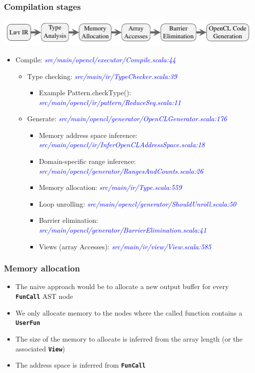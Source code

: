 \documentclass[10pt]{beamer}
\newcommand{\srcurl}[1]{\textcolor{blue}{\textit{#1}}}
\newcommand{\code}[1]{\textbf{\texttt{#1}}}
\begin{document}
\begin{frame}
\frametitle{Compilation stages}
    \begin{block}{}
        \begin{center}
            \includegraphics[width=1\textwidth]{../images/compilation_stages.pdf}
        \end{center}
    \end{block}
    \vspace{-0.5cm}
\begin{itemize}
    \item Compile: \srcurl{src/main/opencl/executor/Compile.scala:44}
    \begin{itemize}
    	\item Type checking: \srcurl{src/main/ir/TypeChecker.scala:39}
    	\begin{itemize}
    		\item Example Pattern.checkType(): \srcurl{src/main/opencl/ir/pattern/ReduceSeq.scala:11}
    	\end{itemize}
    	\item Generate: \srcurl{src/main/opencl/generator/OpenCLGenerator.scala:176}
    	\begin{itemize}
    		\item Memory address space inference: \srcurl{src/main/opencl/ir/InferOpenCLAddressSpace.scala:18}
    		\item Domain-specific range inference: \srcurl{src/main/opencl/generator/RangesAndCounts.scala:26}
    		\item Memory allocation: \srcurl{src/main/ir/Type.scala:559}
    		\item Loop unrolling: \srcurl{src/main/opencl/generator/ShouldUnroll.scala:50}
    		\item Barrier elimination: \srcurl{src/main/opencl/generator/BarrierElimination.scala:41}
    		\item Views (array Accesses): \srcurl{src/main/ir/view/View.scala:585}
    	\end{itemize}
    \end{itemize}
\end{itemize}
\end{frame}

\begin{frame}
\frametitle{Memory allocation}
\begin{itemize}
	\item The naive approach would be to allocate a new output buffer for every \code{FunCall} AST node
	\item We only allocate memory to the nodes where the called function contains a \code{UserFun}
	\item The size of the memory to allocate is inferred from the array length (or the associated \code{View})
	\item The address space is inferred from \code{FunCall}
\end{itemize}
\end{frame}
\end{document}
